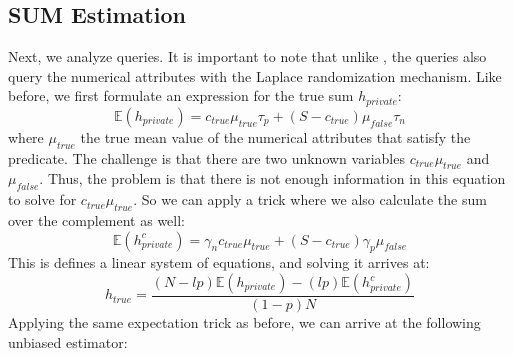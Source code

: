 

\iffalse
\begin{theorem}
Given a COUNT query with a predicate that spans $l$ entities out of $N$ possible entities, the result estimate and the confidence intervals are:
\noindent\textbf{Confidence Intervals with probability $1-\alpha$:}
\[c_{true}=\hat{c}\pm\frac{1}{1-p}\sqrt{\frac{S}{2}\ln(\frac{2}{\alpha})}\]
\end{theorem}
\begin{proof}
To prove this, first, we formulate an unbiased estimator:
\[
\mathbb{E}(c_{private})=c_{true}\tau_p+(S-c_{true})\tau_n
\]
\[
\mathbb{E}(c_{private})=c_{true}(\tau_p-\tau_n)+S\tau_n
\]
\[
\frac{\mathbb{E}(c_{private})-S\tau_n}{(\tau_p-\tau_n)}=c_{true}
\]
Then, applying Hoeffding's inequality:
\[
P(\mid c_{private}-\mathbb{E}(c_{private})\mid\ge t)\le2\exp(-\frac{2t^{2}}{S})
\]
\[
\sqrt{\frac{S}{2}\ln(\frac{2}{\alpha})}=t
\]
It follows that for this estimator:
\[
c_{true}=\hat{c}_{true}\pm\frac{1}{1-p}\sqrt{\frac{S}{2}\ln(\frac{2}{\alpha})}
\]
\[
c_{true}=\hat{c}_{true}\pm\frac{\gamma_{\alpha}}{1-p}\sqrt{\frac{S}{2}}
\]
\end{proof}
\fi

\subsection{SUM Estimation}
Next, we analyze \sumfunc queries.
It is important to note that unlike \countfunc, the \sumfunc queries also query the numerical attributes with the Laplace randomization mechanism.
Like before, we first formulate an expression for the true sum $h_{private}$:
\[
\mathbb{E}(h_{private})=c_{true}\mu_{true}\tau_p+(S-c_{true})\mu_{false}\tau_n
\]
where $\mu_{true}$ the true mean value of the numerical attributes that satisfy the predicate.
The challenge is that there are two unknown variables $c_{true}\mu_{true}$
and $\mu_{false}$.
Thus, the problem is that there is not enough information in this equation to solve for $c_{true}\mu_{true}$.
So we can apply a trick where we also calculate the sum over the complement as well:
\[
\mathbb{E}(h_{private}^{c})=\gamma_n c_{true}\mu_{true}+(S-c_{true})\gamma_p\mu_{false}
\]
This is defines a linear system of equations, and solving it arrives at:
\[
h_{true} =\frac{(N-lp)\mathbb{E}(h_{private})-(lp)\mathbb{E}(h_{private}^{c})}{(1-p)N}
\]
Applying the same expectation trick as before, we can arrive at the following unbiased estimator:

